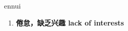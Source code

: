 
\begin{frame}
{\huge ennui}
\begin{center}
\begin{enumerate}\Large
  \item \textbf{倦怠，缺乏兴趣 lack of interests}
\end{enumerate}
\end{center}
\end{frame}
